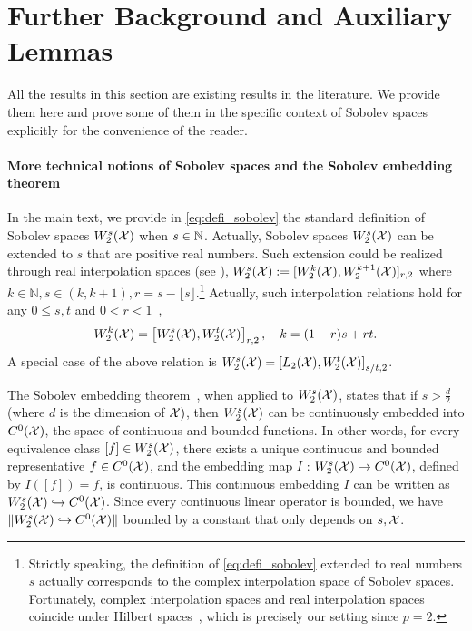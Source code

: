 \section{Further Background and Auxiliary Lemmas}\label{appendix:aux_lemmas}
All the results in this section are existing results in the literature. We provide them here and prove some of them in the specific context of Sobolev spaces explicitly for the convenience of the reader.

\paragraph{More technical notions of Sobolev spaces and the Sobolev embedding theorem}
In the main text, we provide in \eqref{eq:defi_sobolev} the standard definition of Sobolev spaces $W_2^s( \mathcal{X} )$ when $s \in \mathbb{N}$.
Actually, Sobolev spaces $W_2^s( \mathcal{X} )$
can be extended to $s$ that are positive real numbers. 
Such extension could be realized through 
real interpolation spaces (see \citep[Definition 1.7]{bennett1988interpolation}),
$W_2^{s}(\mathcal{X}) := [W_2^{k}(\mathcal{X}), W_2^{k+1}(\mathcal{X})]_{r, 2}$ where $k \in \mathbb{N}, s \in (k, k+1), r = s-\lfloor s\rfloor$.\footnote{Strictly speaking, the definition of \eqref{eq:defi_sobolev} extended to real numbers $s$ actually corresponds to the complex interpolation space of Sobolev spaces. Fortunately, complex interpolation spaces and real interpolation spaces coincide under Hilbert spaces~\citep[Corollary C.4.2]{hytonen2016analysis}, which is precisely our setting since $p=2$.}
Actually, such interpolation relations hold for any $0 \leq s , t$ and $0 < r < 1$~\citep[Section 7.32]{adams2003sobolev},
\begin{align}\label{eq:interpolation}
    W_{2}^k(\mathcal{X}) = \left[W_2^s(\mathcal{X}), W_{2}^t(\mathcal{X})\right]_{r, 2}, \quad k = (1-r) s + r t .
\end{align}
A special case of the above relation is $ W_{2}^s(\mathcal{X}) = \left[L_2(\mathcal{X}), W_{2}^t(\mathcal{X})\right]_{s/t, 2} $. 

The Sobolev embedding theorem~\citep{adams2003sobolev}, when applied to $W_2^s(\mathcal{X})$, states that if $s>\frac{d}{2}$ (where $d$ is the dimension of $\mathcal{X})$, then $W_2^s(\mathcal{X})$ can be continuously embedded into $C^0(\mathcal{X})$, the space of continuous and bounded functions. In other words, for every equivalence class $[f] \in W_2^s(\mathcal{X})$, there exists a unique continuous and bounded representative $f \in C^0(\mathcal{X})$, and the embedding map $I$ : $W_2^s(\mathcal{X}) \rightarrow C^0(\mathcal{X})$, defined by $I([f])=f$, is continuous.
This continuous embedding $I$ can be written as $W_2^s(\mathcal{X}) \hookrightarrow C^0(\mathcal{X})$. 
Since every continuous linear operator is bounded, we have $\| W_2^s(\mathcal{X}) \hookrightarrow C^0(\mathcal{X})\|$ bounded by a constant that only depends on $s, \mathcal{X}$.

